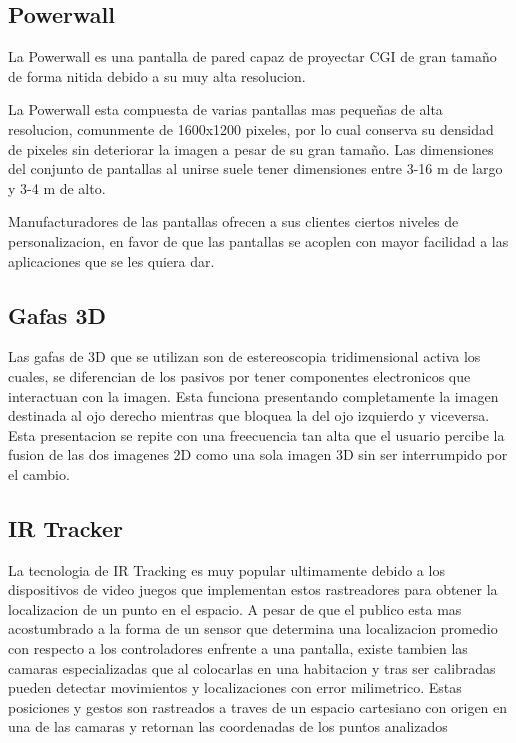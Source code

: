 \documentclass[11pt]{article} %
\begin{document}
\subsection{Powerwall}
La Powerwall es una pantalla de pared capaz de proyectar CGI de gran tamaño de forma nitida debido a su muy alta resolucion.

La Powerwall esta compuesta de varias pantallas mas pequeñas de alta resolucion, comunmente de 1600x1200 pixeles, por lo cual conserva su densidad de pixeles sin deteriorar la imagen a pesar de su gran tamaño. Las dimensiones del conjunto de pantallas al unirse suele tener dimensiones entre 3-16 m de largo y 3-4 m de alto.

Manufacturadores de las pantallas ofrecen a sus clientes ciertos niveles de personalizacion, en favor de que las pantallas se acoplen con mayor facilidad a las aplicaciones que se les quiera dar.\\

\subsection{Gafas 3D}
Las gafas de 3D que se utilizan son de estereoscopia tridimensional activa los cuales, se diferencian de los pasivos por tener componentes electronicos que interactuan con la imagen. Esta funciona presentando completamente la imagen destinada al ojo derecho mientras que bloquea la del ojo izquierdo y viceversa. Esta presentacion se repite con una freecuencia tan alta que el usuario percibe la fusion de las dos imagenes 2D como una sola imagen 3D sin ser interrumpido por el cambio.\\

\subsection{IR Tracker}
La tecnologia de IR Tracking es muy popular ultimamente debido a los dispositivos de video juegos que implementan estos rastreadores para obtener la localizacion de un punto en el espacio. A pesar de que el publico esta mas acostumbrado a la forma de un sensor que determina una localizacion promedio con respecto a los controladores enfrente a una pantalla, existe tambien las camaras especializadas que al colocarlas en una habitacion y tras ser calibradas pueden detectar movimientos y localizaciones con error milimetrico. Estas posiciones y gestos son rastreados a traves de un espacio cartesiano con origen en una de las camaras y retornan las coordenadas de los puntos analizados
\end{document}
